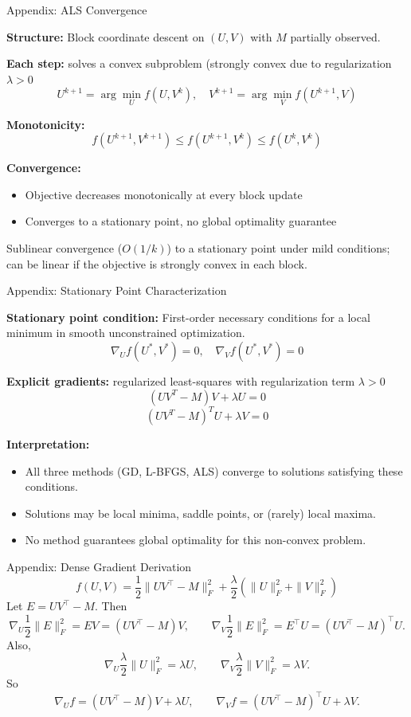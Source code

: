\documentclass[aspectratio=169,usenames,dvipsnames]{beamer}
\begin{document}
\begin{frame}{Appendix: ALS Convergence}

\textbf{Structure:} Block coordinate descent on $(U, V)$ with $M$ partially observed.

\textbf{Each step:} solves a convex subproblem (strongly convex due to regularization $\lambda > 0$ 
\[
U^{k+1} = \arg\min_U f(U, V^k), \quad
V^{k+1} = \arg\min_V f(U^{k+1}, V)
\]

\textbf{Monotonicity:}
\[
f(U^{k+1}, V^{k+1}) \leq f(U^{k+1}, V^k) \leq f(U^k, V^k)
\]

\textbf{Convergence:}
\begin{itemize}
    \item Objective decreases monotonically at every block update
    \item Converges to a stationary point, no global optimality guarantee
\end{itemize}

Sublinear convergence ($O(1/k)$) to a stationary point under mild conditions; can be linear if the objective is strongly convex in each block. 

\end{frame}

\begin{frame}{Appendix: Stationary Point Characterization}

\textbf{Stationary point condition:} First-order necessary conditions for a local minimum in smooth unconstrained optimization.
\[
\nabla_U f(U^*, V^*) = 0, \quad \nabla_V f(U^*, V^*) = 0
\]

\textbf{Explicit gradients:} regularized least-squares with regularization term $\lambda > 0$
\[
(UV^T - M)V + \lambda U = 0
\]
\[
(UV^T - M)^T U + \lambda V = 0
\]

\textbf{Interpretation:}
\begin{itemize}
    \item All three methods (GD, L-BFGS, ALS) converge to solutions satisfying these conditions.
    \item Solutions may be local minima, saddle points, or (rarely) local maxima.
    \item No method guarantees global optimality for this non-convex problem.
\end{itemize}

\end{frame}

\begin{frame}{Appendix: Dense Gradient Derivation}
\[
f(U,V)=\frac12\|UV^\top-M\|_F^2+\frac{\lambda}{2}\left(\|U\|_F^2+\|V\|_F^2\right)
\]
Let \(E=UV^\top-M\). Then
\[
\nabla_U \frac12\|E\|_F^2 = EV=(UV^\top-M)V,
\qquad
\nabla_V \frac12\|E\|_F^2 = E^\top U=(UV^\top-M)^\top U.
\]
Also,
\[
\nabla_U \frac{\lambda}{2}\|U\|_F^2=\lambda U,
\qquad
\nabla_V \frac{\lambda}{2}\|V\|_F^2=\lambda V.
\]
So
\[
\nabla_U f=(UV^\top-M)V+\lambda U,
\qquad
\nabla_V f=(UV^\top-M)^\top U+\lambda V.
\]
\end{frame}
\end{document}
